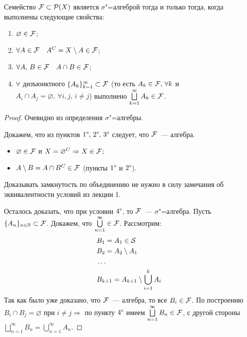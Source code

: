 \begin{claim}[Критерий $\sigma$"=алгебры]
    Семейство $\mathcal{F} \subset \mathcal{P}(X)$ является $\sigma$"=алгеброй тогда и только тогда, когда выполнены следующие свойства: 
    \begin{enumerate}[label=\arabic*\degree.]
        \item $\varnothing\in\mathcal{F} $;
        \item $\forall A\in\mathcal{F}  \quad A^C=X\setminus A\in\mathcal{F} $;
        \item $\forall A,\, B\in\mathcal{F} \quad A\cap B\in\mathcal{F} $;
        \item $\forall$ дизъюнктного $\{A_k\}_{k=1}^{\infty}\subset \mathcal{F} $ (то есть $A_k\in\mathcal{F} , \, \forall k$ и
        $A_i\cap A_j=\varnothing,\, \forall i,j,\, i\neq j$) выполнено $\bigsqcup\limits_{k=1}^{\infty}A_k\in\mathcal{F} $.
    \end{enumerate}

    \begin{proof}
        \circled{$\Rightarrow$} Очевидно из определения $\sigma$"=алгебры.

        \circled{$\Leftarrow$} Докажем, что из пунктов $1\degree, \, 2\degree,\, 3\degree$ следует, что $\mathcal{F} $~--- алгебра.
        \begin{itemize}
            \item $\varnothing\in\mathcal{F} $ и $X = \varnothing^C\Rightarrow X\in\mathcal{F} $;
            \item $A\setminus B = A\cap B^C\in\mathcal{F} $ (пункты $1\degree$ и $2\degree$).
        \end{itemize}
        \begin{remark}
            Доказывать замкнутость по объединению не нужно в силу замечания об эквивалентности условий из лекции 1.%
        \end{remark}

        Осталось доказать, что при условии $4\degree$, то $\mathcal{F} $~--- $\sigma$"=алгебра. Пусть 
        $\{A_n\}_{n\in\mathbb{N}}\subset \mathcal{F} $. Докажем, что $\bigcup\limits_{n=1}^{\infty}\in\mathcal{F} $.
        Рассмотрим:
        \begin{align*}
            &B_1 = A_1\in\mathcal{S}\\
            &B_2 = A_2\setminus A_1\\
            &\ldots\\
            &B_{k+1}=A_{k+1}\setminus\bigcup_{i=1}^k A_i
        \end{align*}
        Так как было уже доказано, что $\mathcal{F} $~--- алгебра, то все $B_i\in\mathcal{F} $. По построению $B_i\cap B_j=\varnothing$ при
        $i\neq j\Rightarrow$ по пункту $4\degree$ имеем $\bigsqcup\limits_{n=1}^{\infty}B_n\in\mathcal{F} $, с другой стороны 
        $\bigsqcup\limits_{n=1}^{\infty}B_n = \bigcup\limits_{n=1}^{\infty}A_n$.

    \end{proof}
\end{claim}

